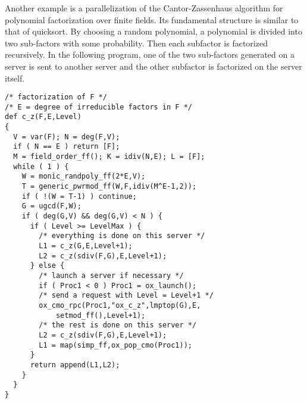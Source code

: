 Another example is a parallelization of the Cantor-Zassenhaus
algorithm for polynomial factorization over finite fields. Its
fundamental structure is similar to that of quicksort. By choosing a
random polynomial, a polynomial is divided into two sub-factors with
some probability. Then each subfactor is factorized recursively.  In
the following program, one of the two sub-factors generated on a server
is sent to another server and the other subfactor is factorized on the server
itself. 
\begin{verbatim}
/* factorization of F */
/* E = degree of irreducible factors in F */
def c_z(F,E,Level)
{
  V = var(F); N = deg(F,V);
  if ( N == E ) return [F];
  M = field_order_ff(); K = idiv(N,E); L = [F];
  while ( 1 ) {
    W = monic_randpoly_ff(2*E,V);
    T = generic_pwrmod_ff(W,F,idiv(M^E-1,2));
    if ( !(W = T-1) ) continue;
    G = ugcd(F,W);
    if ( deg(G,V) && deg(G,V) < N ) {
      if ( Level >= LevelMax ) {
        /* everything is done on this server */
        L1 = c_z(G,E,Level+1);
        L2 = c_z(sdiv(F,G),E,Level+1);
      } else {
        /* launch a server if necessary */
        if ( Proc1 < 0 ) Proc1 = ox_launch();
        /* send a request with Level = Level+1 */
        ox_cmo_rpc(Proc1,"ox_c_z",lmptop(G),E,
            setmod_ff(),Level+1);
        /* the rest is done on this server */
        L2 = c_z(sdiv(F,G),E,Level+1);
        L1 = map(simp_ff,ox_pop_cmo(Proc1));
      }
      return append(L1,L2);
    }
  }
}
\end{verbatim}







